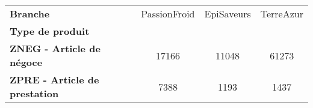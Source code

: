 \begin{tabular}{lccc}
\toprule
\textbf{Branche} &  PassionFroid &  EpiSaveurs &  TerreAzur \\
\textbf{Type de produit             } &               &             &            \\
\midrule
\textbf{ZNEG - Article de négoce    } &         17166 &       11048 &      61273 \\
\textbf{ZPRE - Article de prestation} &          7388 &        1193 &       1437 \\
\bottomrule
\end{tabular}
